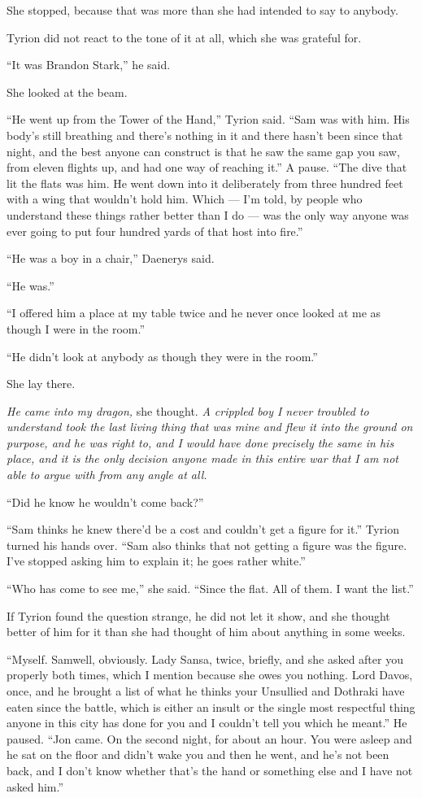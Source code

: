 She stopped, because that was more than she had intended to say to anybody.

Tyrion did not react to the tone of it at all, which she was grateful for.

“It was Brandon Stark,” he said.

She looked at the beam.

“He went up from the Tower of the Hand,” Tyrion said. “Sam was with him. His body’s still breathing and there’s nothing in it and there hasn’t been since that night, and the best anyone can construct is that he saw the same gap you saw, from eleven flights up, and had one way of reaching it.” A pause. “The dive that lit the flats was him. He went down into it deliberately from three hundred feet with a wing that wouldn’t hold him. Which — I’m told, by people who understand these things rather better than I do — was the only way anyone was ever going to put four hundred yards of that host into fire.”

“He was a boy in a chair,” Daenerys said.

“He was.”

“I offered him a place at my table twice and he never once looked at me as though I were in the room.”

“He didn’t look at anybody as though they were in the room.”

She lay there.

\textit{He came into my dragon,} she thought. \textit{A crippled boy I never troubled to understand took the last living thing that was mine and flew it into the ground on purpose, and he was right to, and I would have done precisely the same in his place, and it is the only decision anyone made in this entire war that I am not able to argue with from any angle at all.}

“Did he know he wouldn’t come back?”

“Sam thinks he knew there’d be a cost and couldn’t get a figure for it.” Tyrion turned his hands over. “Sam also thinks that not getting a figure was the figure. I’ve stopped asking him to explain it; he goes rather white.”

\sceneBreak

“Who has come to see me,” she said. “Since the flat. All of them. I want the list.”

If Tyrion found the question strange, he did not let it show, and she thought better of him for it than she had thought of him about anything in some weeks.

“Myself. Samwell, obviously. Lady Sansa, twice, briefly, and she asked after you properly both times, which I mention because she owes you nothing. Lord Davos, once, and he brought a list of what he thinks your Unsullied and Dothraki have eaten since the battle, which is either an insult or the single most respectful thing anyone in this city has done for you and I couldn’t tell you which he meant.” He paused. “Jon came. On the second night, for about an hour. You were asleep and he sat on the floor and didn’t wake you and then he went, and he’s not been back, and I don’t know whether that’s the hand or something else and I have not asked him.”

